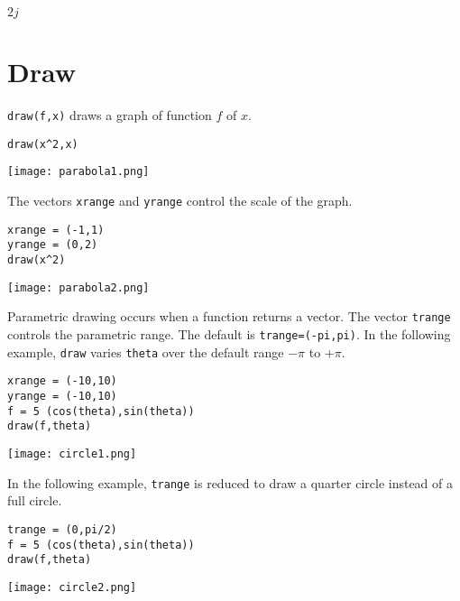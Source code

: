 \documentclass[12pt]{article}
\begin{document}
$\displaystyle 2j$

\newpage

\section{Draw}

\verb$draw(f,x)$ draws a graph of function $f$ of $x$.

{\color{blue}
\begin{verbatim}
draw(x^2,x)
\end{verbatim}}

\begin{center}
\texttt{[image: parabola1.png]}
\end{center}

The vectors \verb$xrange$ and \verb$yrange$ control the scale of the graph.

{\color{blue}
\begin{verbatim}
xrange = (-1,1)
yrange = (0,2)
draw(x^2)
\end{verbatim}}

\begin{center}
\texttt{[image: parabola2.png]}
\end{center}

Parametric drawing occurs when a function returns a vector.
The vector \verb$trange$ controls the parametric range.
The default is \verb$trange=(-pi,pi)$.
In the following example, \verb$draw$ varies \verb$theta$
over the default range $-\pi$ to $+\pi$.

{\color{blue}
\begin{verbatim}
xrange = (-10,10)
yrange = (-10,10)
f = 5 (cos(theta),sin(theta))
draw(f,theta)
\end{verbatim}}

\begin{center}
\texttt{[image: circle1.png]}
\end{center}

In the following example, \verb$trange$ is reduced
to draw a quarter circle instead of a full circle.

{\color{blue}
\begin{verbatim}
trange = (0,pi/2)
f = 5 (cos(theta),sin(theta))
draw(f,theta)
\end{verbatim}}

\begin{center}
\texttt{[image: circle2.png]}
\end{center}
\end{document}
